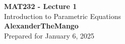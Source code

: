 \begin{titlepage}
    \null %
    \vfill
    \begin{center}
        {\fontsize{40}{48}\selectfont \bfseries MAT232 - Lecture 1}
        \vspace{20pt} \\
        {\LARGE Introduction to Parametric Equations} \\
        \vspace{20pt}
        \textbf{AlexanderTheMango}
        \vspace{8pt}
        \\ Prepared for January 6, 2025
    \end{center}
    \vfill
\end{titlepage}
